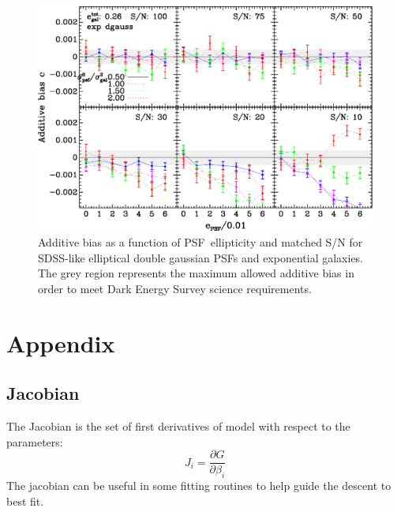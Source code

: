 \documentclass[12pt,preprint]{aastex}
\newcommand{\psf}{PSF}
\begin{document}
\begin{figure}[t] \centering
 \centering 
 \includegraphics[scale=1]{figures/set-epsf-edg01-yr-0.003-0.003-vs-epsf.eps}

 \caption{Additive bias as a function of \psf\ ellipticity and matched S/N for
 SDSS-like elliptical double gaussian \psf s and exponential galaxies.  The grey
 region represents the maximum allowed additive bias in order to meet Dark
 Energy Survey science requirements.  }

 \label{fig:edgadderr}

\end{figure}







\appendix 

\section{Appendix}
\subsection{Jacobian}

The Jacobian is the set of first derivatives of model with respect
to the parameters:
\begin{equation}
J_i = \frac{\partial G}{\partial \beta_i}
\end{equation}
The jacobian can be useful in some fitting routines to help guide the descent
to best fit.
\end{document}
